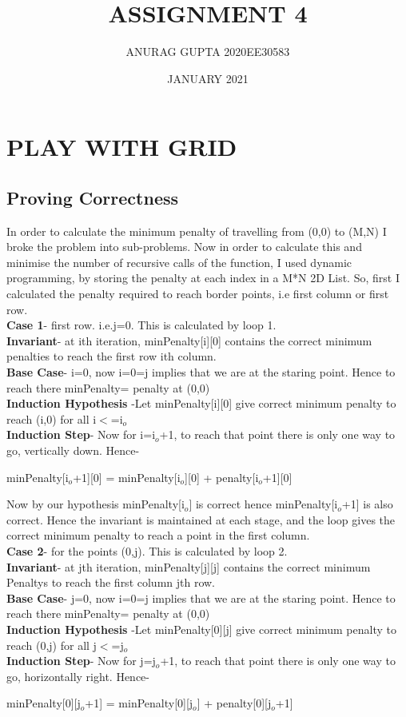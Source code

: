 \documentclass{article}
\title{ASSIGNMENT 4}
\author{ANURAG GUPTA  2020EE30583}
\date{JANUARY 2021}
\begin{document}
\maketitle

\section{PLAY WITH GRID}
\subsection{Proving Correctness}
In order to calculate the minimum penalty of travelling from (0,0) to (M,N) I broke the problem into sub-problems. Now in order to calculate this and minimise the number of recursive calls of the function,  I used dynamic programming, by storing the penalty at each index in a M*N 2D List. So, first I calculated the penalty required to reach border points, i.e first column or first row.\\

\textbf{Case 1}- first row. i.e.j=0. This is calculated by loop 1.\\
\textbf{Invariant}-  at ith iteration, minPenalty[i][0] contains the correct minimum penalties to reach the first row ith column.\\
\textbf{Base Case}- i=0, now i=0=j implies that we are at the staring point. Hence to reach there minPenalty= penalty at (0,0)\\
\textbf{Induction Hypothesis} -Let minPenalty[i][0] give correct minimum penalty to reach (i,0) for all i$<$=i$_o$\\
\textbf{Induction Step}- Now for i=i$_o$+1, to reach that point there is only one way to go, vertically down. Hence-
\begin{center}minPenalty[i$_o$+1][0] = minPenalty[i$_o$][0] + penalty[i$_o$+1][0]\end{center}

Now by our hypothesis minPenalty[i$_o$] is correct hence minPenalty[i$_o$+1] is also correct. Hence the  invariant is maintained at each stage, and the loop gives the correct minimum penalty to reach a point in the first column.\\

\textbf{Case 2}- for the points (0,j). This is calculated by loop 2.\\
\textbf{Invariant}-  at jth iteration, minPenalty[j][j] contains the correct minimum Penaltys to reach the first column jth row.\\
\textbf{Base Case}- j=0, now i=0=j implies that we are at the staring point. Hence to reach there minPenalty= penalty at (0,0)\\
\textbf{Induction Hypothesis} -Let minPenalty[0][j] give correct minimum penalty to reach (0,j) for all j$<$=j$_o$\\
\textbf{Induction Step}- Now for j=j$_o$+1, to reach that point there is only one way to go, horizontally right. Hence-
\begin{center}minPenalty[0][j$_o$+1] = minPenalty[0][j$_o$] + penalty[0][j$_o$+1]\end{center}
\end{document}
